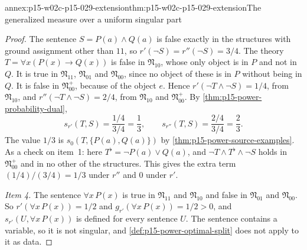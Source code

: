 \begin{annexitem}{annex:p15-w02c-p15-029-extension}{thm:p15-w02c-p15-029-extension}{The generalized measure over a uniform singular part}
\begin{proof}
The sentence \(S=P(a)\land Q(a)\) is false exactly in the structures with
ground assignment other than \(11\), so \(r'(\neg S)=r''(\neg S)=3/4\).
The theory \(T=\forall x(P(x)\to Q(x))\) is false in \(\mathfrak N_{10}\),
whose only object is in \(P\) and not in \(Q\). It is true in
\(\mathfrak N_{11}\), \(\mathfrak N_{01}\) and \(\mathfrak N_{00}\), since
no object of these is in \(P\) without being in \(Q\). It is false in
\(\mathfrak N_{00}^+\), because of the object \(e\). Hence
\(r'(\neg T\land\neg S)=1/4\), from \(\mathfrak N_{10}\), and
\(r''(\neg T\land\neg S)=2/4\), from \(\mathfrak N_{10}\) and
\(\mathfrak N_{00}^+\). By \cref{thm:p15-power-probability-dual},
\[
 s_{r'}(T,S)=\frac{1/4}{3/4}=\frac13,\qquad
 s_{r''}(T,S)=\frac{2/4}{3/4}=\frac23 .
\]
The value \(1/3\) is \(s_0(T,\{P(a),Q(a)\})\) by
\cref{thm:p15-power-source-examples}. As a check on item~1: here
\(T^\flat=\neg P(a)\lor Q(a)\), and \(\neg T\land T^\flat\land\neg S\)
holds in \(\mathfrak N_{00}^+\) and in no other of the structures. This
gives the extra term \((1/4)/(3/4)=1/3\) under \(r''\) and \(0\) under
\(r'\).

\emph{Item 4.} The sentence \(\forall x\,P(x)\) is true in
\(\mathfrak N_{11}\) and \(\mathfrak N_{10}\) and false in
\(\mathfrak N_{01}\) and \(\mathfrak N_{00}\). So
\(r'(\forall x\,P(x))=1/2\) and \(g_{r'}(\forall x\,P(x))=1/2>0\), and
\(s_{r'}(U,\forall x\,P(x))\) is defined for every sentence \(U\). The
sentence contains a variable, so it is not singular, and
\cref{def:p15-power-optimal-split} does not apply to it as data.
\end{proof}
\end{annexitem}

